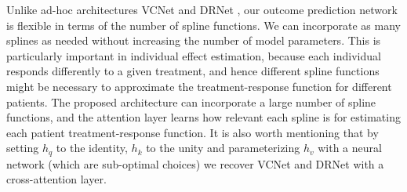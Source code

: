 \documentclass[letterpaper]{article} %
\begin{document}
\newline
\newline
Unlike ad-hoc architectures VCNet \cite{nie2021vcnet} and DRNet \cite{Schwab_2020}, our outcome prediction network is flexible in terms of the number of spline functions. We can incorporate as many splines as needed without increasing the number of model parameters. This is particularly important in individual effect estimation, because each individual responds differently to a given treatment, and hence different spline functions might be necessary to approximate the treatment-response function for different patients. The proposed architecture can incorporate a large number of spline functions, and the attention layer learns how relevant each spline is for estimating each patient treatment-response function.  
It is also worth mentioning that by setting $h_q$ to the identity, $h_k$ to the unity and parameterizing $h_v$ with a neural network (which are sub-optimal choices) we recover VCNet and DRNet with a cross-attention layer.
\end{document}
